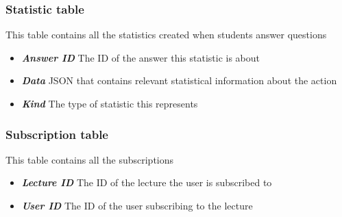 \subsubsection{Statistic table}
This table contains all the statistics created when students answer questions

\begin{itemize}
	\item  \textit{\textbf{Answer ID}} The ID of the answer this statistic is about
	\item  \textit{\textbf{Data}} JSON that contains relevant statistical information about the action
	\item  \textit{\textbf{Kind}} The type of statistic this represents
\end{itemize}



\subsubsection{Subscription table}
This table contains all the subscriptions

\begin{itemize}
	\item  \textit{\textbf{Lecture ID}} The ID of the lecture the user is subscribed to
	\item  \textit{\textbf{User ID}} The ID of the user subscribing to the lecture
\end{itemize}





















